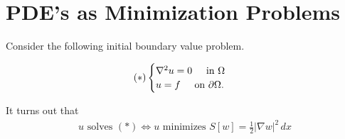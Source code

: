 \documentclass{article}
\newcommand{\p}{\partial}
\begin{document}
\section{PDE's as Minimization Problems}

Consider the following initial boundary value problem. 

\begin{align}
(\ast) \begin{cases}
\nabla^2 u = 0 \hspace{0.5cm} \text{in $\Omega$}\\
u = f \hspace{0.5cm} \text{on $\p\Omega$}.
\end{cases}
\end{align}

It turns out that
\begin{align}
\boxed{\text{$u$ solves $(\ast)$} \iff \text{$u$ minimizes $S[w] = \frac{1}{2}\vert \nabla w\vert^2\,dx$}} 
\end{align}
\end{document}
